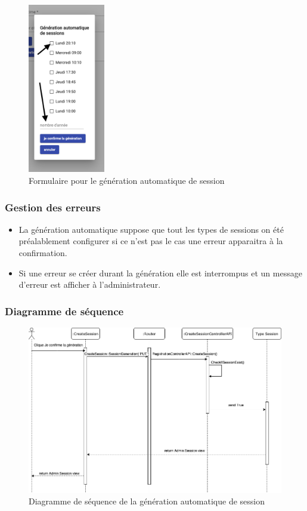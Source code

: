 \vspace{\baselineskip}
\begin{figure}[h]
	\includegraphics[width=0.3\textwidth,center]{Figures/us16-3}
	\caption{Formulaire pour le génération automatique de session}
\end{figure}


\subsubsection{Gestion des erreurs}
	\begin{itemize}
		\item La génération automatique suppose que tout les types de sessions on été préalablement configurer si ce n'est pas le cas une erreur apparaitra à la confirmation.
		\item Si une erreur se créer durant la génération elle est interrompus et un message d'erreur est afficher à l'administrateur.
	\end{itemize}
	
\newpage
\subsubsection{Diagramme de séquence}
	\begin{figure}[h]
		\includegraphics[width=\textwidth,center]{Diagramme/sequence-us16}
		\caption{Diagramme de séquence de la génération automatique de session}
	\end{figure}
	

